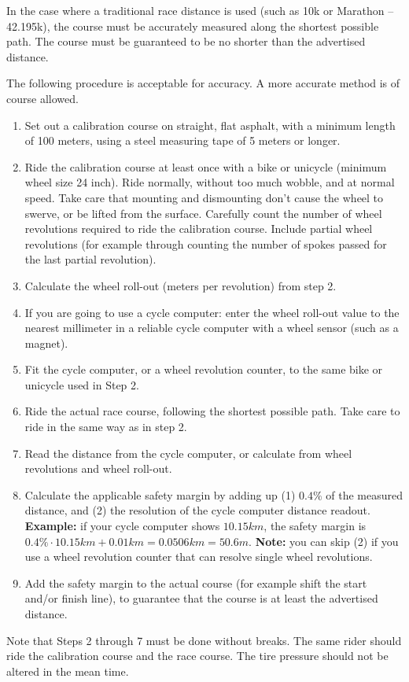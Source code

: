 In the case where a traditional race distance is used (such as 10k or Marathon -- 42.195k), the course must be accurately measured along the shortest possible path.
The course must be guaranteed to be no shorter than the advertised distance.

The following procedure is acceptable for accuracy.
A more accurate method is of course allowed.
\begin{enumerate}
\item Set out a calibration course on straight, flat asphalt, with a minimum length of 100 meters, using a steel measuring tape of 5 meters or longer.
\item Ride the calibration course at least once with a bike or unicycle (minimum wheel size 24 inch).
Ride normally, without too much wobble, and at normal speed.
Take care that mounting and dismounting don't cause the wheel to swerve, or be lifted from the surface.
Carefully count the number of wheel revolutions required to ride the calibration course.
Include partial wheel revolutions (for example through counting the number of spokes passed for the last partial revolution).
\item Calculate the wheel roll-out (meters per revolution) from step 2.
\item If you are going to use a cycle computer: enter the wheel roll-out value to the nearest millimeter in a reliable cycle computer with a wheel sensor (such as a magnet).
\item Fit the cycle computer, or a wheel revolution counter, to the same bike or unicycle used in Step 2.
\item Ride the actual race course, following the shortest possible path.
Take care to ride in the same way as in step 2.
\item Read the distance from the cycle computer, or calculate from wheel revolutions and wheel roll-out.
\item Calculate the applicable safety margin by adding up (1) $0.4\%$ of the measured distance, and (2) the resolution of the cycle computer distance readout.
\textbf{Example:} if your cycle computer shows $10.15\unit{km}$, the safety margin is $0.4\% \cdot 10.15\unit{km} + 0.01\unit{km} = 0.0506\unit{km} = 50.6\unit{m}$.
\textbf{Note:} you can skip (2) if you use a wheel revolution counter that can resolve single wheel revolutions.
\item Add the safety margin to the actual course (for example shift the start and/or finish line), to guarantee that the course is at least the advertised distance.
\end{enumerate}
Note that Steps 2 through 7 must be done without breaks.
The same rider should ride the calibration course and the race course.
The tire pressure should not be altered in the mean time.

